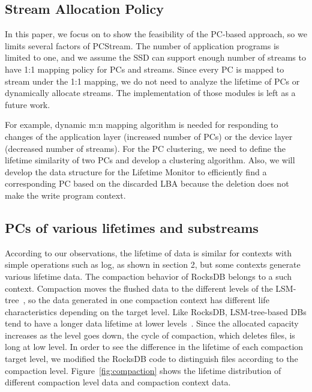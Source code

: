 \subsection{Stream Allocation Policy}
In this paper, we focus on to show the feasibility of the PC-based approach, 
so we limits several factors of PCStream.
The number of application programs is limited to one, 
and we assume the SSD can support enough number of streams
to have 1:1 mapping policy for PCs and streams.
Since every PC is mapped to stream under the 1:1 mapping, 
we do not need to analyze the lifetime of PCs 
or dynamically allocate streams.
The implementation of those modules 
is left as a future work. 

For example, dynamic m:n mapping algorithm is
needed for responding to changes of
the application layer (increased number of PCs)
or the device layer (decreased number of streams).
For the PC clustering, we need to define the lifetime similarity of two PCs
and develop a clustering algorithm.
Also, we will develop the data structure
for the Lifetime Monitor to efficiently find a corresponding PC 
based on the discarded LBA because the deletion does not
make the write program context.

\subsection{PCs of various lifetimes and substreams}
According to our observations, the lifetime of data is similar 
for contexts with simple operations such as log, as shown in section 2, 
but some contexts generate various lifetime data.
The compaction behavior of RocksDB belongs to a such context.
Compaction moves the flushed data to the different levels
of the LSM-tree~\cite{RocksDB}, 
so the data generated in one compaction context has 
different life characteristics depending on the target level.
Like RocksDB, LSM-tree-based DBs tend to have a longer 
data lifetime at lower levels~\cite{Level}.
Since the allocated capacity increases as the level goes down, 
the cycle of compaction, which deletes files, is long at low level.
In order to see the difference in the lifetime of each compaction target level,
we modified the RocksDB code to distinguish files according to the compaction level.
Figure~\ref{fig:compaction} shows the lifetime distribution of 
different compaction level data and compaction context data.

